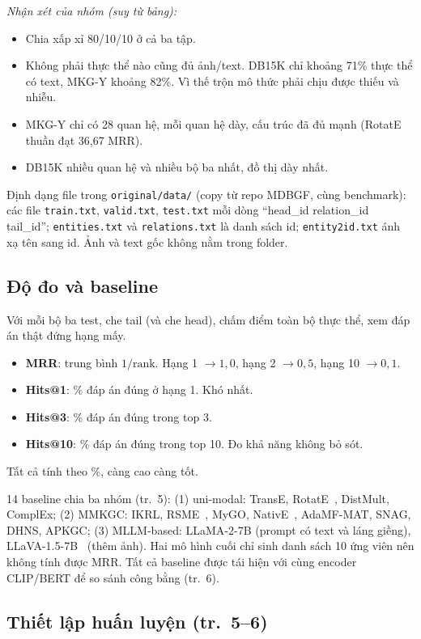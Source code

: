 \documentclass[11pt,a4paper]{article}
\begin{document}
\textit{Nhận xét của nhóm (suy từ bảng):}
\begin{itemize}
\item Chia xấp xỉ 80/10/10 ở cả ba tập.
\item Không phải thực thể nào cũng đủ ảnh/text. DB15K chỉ khoảng 71\% thực thể có text, MKG-Y khoảng 82\%. Vì thế trộn mô thức phải chịu được thiếu và nhiễu.
\item MKG-Y chỉ có 28 quan hệ, mỗi quan hệ dày, cấu trúc đã đủ mạnh (RotatE thuần đạt 36,67 MRR).
\item DB15K nhiều quan hệ và nhiều bộ ba nhất, đồ thị dày nhất.
\end{itemize}

Định dạng file trong \texttt{original/data/} (copy từ repo MDBGF, cùng benchmark): các file \texttt{train.txt}, \texttt{valid.txt}, \texttt{test.txt} mỗi dòng ``head\_id relation\_id tail\_id''; \texttt{entities.txt} và \texttt{relations.txt} là danh sách id; \texttt{entity2id.txt} ánh xạ tên sang id. Ảnh và text gốc không nằm trong folder.

\subsection{Độ đo và baseline}

Với mỗi bộ ba test, che tail (và che head), chấm điểm toàn bộ thực thể, xem đáp án thật đứng hạng mấy.
\begin{itemize}
\item \textbf{MRR}: trung bình $1/\mathrm{rank}$. Hạng 1 $\rightarrow 1{,}0$, hạng 2 $\rightarrow 0{,}5$, hạng 10 $\rightarrow 0{,}1$.
\item \textbf{Hits@1}: \% đáp án đúng ở hạng 1. Khó nhất.
\item \textbf{Hits@3}: \% đáp án đúng trong top 3.
\item \textbf{Hits@10}: \% đáp án đúng trong top 10. Đo khả năng không bỏ sót.
\end{itemize}
Tất cả tính theo \%, càng cao càng tốt.

14 baseline chia ba nhóm (tr.~5): (1) uni-modal: TransE, RotatE~\cite{rotate}, DistMult, ComplEx; (2) MMKGC: IKRL, RSME~\cite{rsme}, MyGO, NativE~\cite{native}, AdaMF-MAT, SNAG, DHNS, APKGC; (3) MLLM-based: LLaMA-2-7B (prompt có text và láng giềng), LLaVA-1.5-7B~\cite{llava} (thêm ảnh). Hai mô hình cuối chỉ sinh danh sách 10 ứng viên nên không tính được MRR. Tất cả baseline được tái hiện với cùng encoder CLIP/BERT để so sánh công bằng (tr.~6).

\subsection{Thiết lập huấn luyện (tr.~5--6)}
\end{document}
